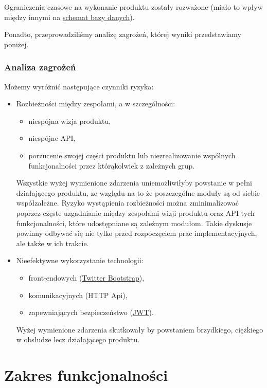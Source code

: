 \documentclass[polish,12pt]{aghthesis}
\begin{document}
Ograniczenia czasowe na wykonanie produktu zostały rozważone (miało to wpływ między innymi na \hyperref[subsec:wykorzystane-technologie-baza]{schemat bazy danych}).

Ponadto, przeprowadziliśmy analizę zagrożeń, której wyniki przedstawiamy poniżej.

\subsubsection{Analiza zagrożeń}
Możemy wyróżnić następujące czynniki ryzyka:
\begin{itemize}
  \item Rozbieżności między zespołami, a w szczególności:
  \begin{itemize}
    \item niespójna wizja produktu,
    \item niespójne API,
    \item porzucenie swojej części produktu lub niezrealizowanie wspólnych funkcjonalności przez którąkolwiek z zależnych grup.
  \end{itemize}
  Wszystkie wyżej wymienione zdarzenia uniemożliwiłyby powstanie w pełni działającego produktu, ze względu na to że poszczególne moduły są od siebie współzależne. Ryzyko wystąpienia rozbieżności można zminimalizować poprzez częste uzgadnianie między zespołami wizji produktu oraz API tych funkcjonalności, które udostępniane są zależnym modułom. Takie dyskusje powinny odbywać się nie tylko przed rozpoczęciem prac implementacyjnych, ale także w ich trakcie.
  \item Nieefektywne wykorzystanie technologii:
  \begin{itemize}
    \item front-endowych (\href{https://getbootstrap.com/}{Twitter Bootstrap}),
    \item komunikacyjnych (HTTP Api),
    \item zapewniających bezpieczeństwo (\href{https://jwt.io/}{JWT}).
  \end{itemize}
  Wyżej wymienione zdarzenia skutkowały by powstaniem brzydkiego, ciężkiego w obsłudze lecz działającego produktu.
\end{itemize}
\section{Zakres funkcjonalności}
\label{sec:zakres-funkcjonalnosci}
\end{document}
